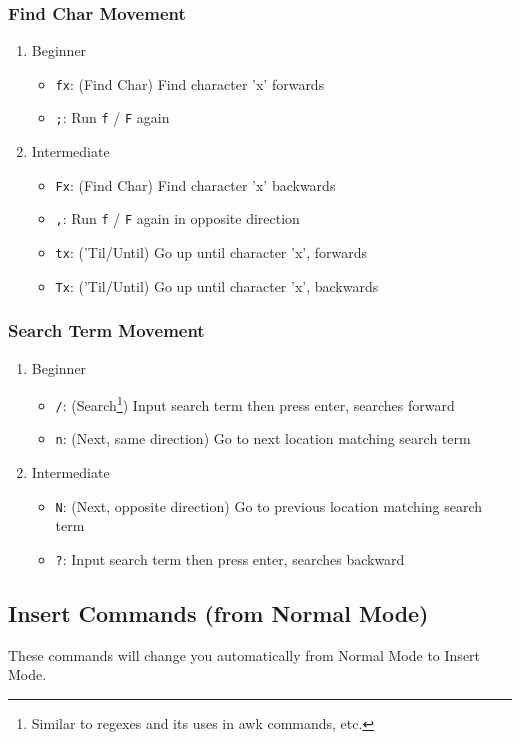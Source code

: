 \documentclass[11pt]{article}
\begin{document}
\subsubsection{Find Char Movement}
\label{sec:orgda40469}
\begin{enumerate}
\item Beginner
\label{sec:org2389022}
\begin{itemize}
\item \texttt{fx}: (Find Char) Find character 'x' forwards
\item \texttt{;}: Run \texttt{f} / \texttt{F} again
\end{itemize}
\item Intermediate
\label{sec:org145af92}
\begin{itemize}
\item \texttt{Fx}: (Find Char) Find character 'x' backwards
\item \texttt{,}: Run \texttt{f} / \texttt{F} again in opposite direction
\item \texttt{tx}: ('Til/Until) Go up until character 'x', forwards
\item \texttt{Tx}: ('Til/Until) Go up until character 'x', backwards
\end{itemize}
\end{enumerate}
\subsubsection{Search Term Movement}
\label{sec:orgbfda41e}
\begin{enumerate}
\item Beginner
\label{sec:org704e72b}
\begin{itemize}
\item \texttt{/}: (Search\footnote{Similar to regexes and its uses in awk commands, etc.}) Input search term then press enter, searches forward
\item \texttt{n}: (Next, same direction) Go to next location matching search term
\end{itemize}
\item Intermediate
\label{sec:orgc32a0d8}
\begin{itemize}
\item \texttt{N}: (Next, opposite direction) Go to previous location matching search term
\item \texttt{?}: Input search term then press enter, searches backward
\end{itemize}
\end{enumerate}
\subsection{Insert Commands (from Normal Mode)}
\label{sec:org831033d}
These commands will change you automatically from Normal Mode to Insert Mode.
\end{document}
